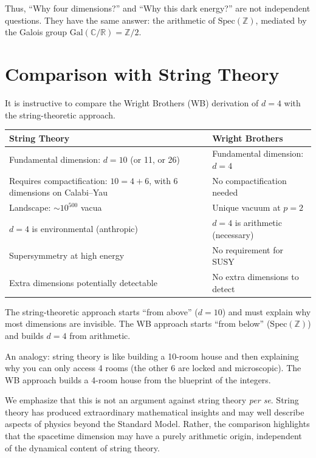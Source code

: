 \documentclass[12pt,a4paper]{article}
\theoremstyle{definition}
\newcommand{\Spec}{\mathrm{Spec}}
\newcommand{\Gal}{\mathrm{Gal}}
\newcommand{\ZZ}{\mathbb{Z}}
\newcommand{\RR}{\mathbb{R}}
\newcommand{\CC}{\mathbb{C}}
\begin{document}
Thus, ``Why four dimensions?'' and ``Why this dark energy?'' are not independent
questions. They have the same answer: the arithmetic of $\Spec(\ZZ)$, mediated by
the Galois group $\Gal(\CC/\RR) = \ZZ/2$.

\section{Comparison with String Theory}\label{sec:comparison}

It is instructive to compare the Wright Brothers (WB) derivation of $d=4$ with the
string-theoretic approach.

\begin{center}
\begin{tabular}{p{5.5cm}p{5.5cm}}
\toprule
\textbf{String Theory} & \textbf{Wright Brothers} \\
\midrule
Fundamental dimension: $d = 10$ (or 11, or 26) &
Fundamental dimension: $d = 4$ \\
\addlinespace
Requires compactification: $10 = 4 + 6$, with 6 dimensions on Calabi--Yau &
No compactification needed \\
\addlinespace
Landscape: $\sim 10^{500}$ vacua &
Unique vacuum at $p=2$ \\
\addlinespace
$d=4$ is environmental (anthropic) &
$d=4$ is arithmetic (necessary) \\
\addlinespace
Supersymmetry at high energy &
No requirement for SUSY \\
\addlinespace
Extra dimensions potentially detectable &
No extra dimensions to detect \\
\bottomrule
\end{tabular}
\end{center}

The string-theoretic approach starts ``from above'' ($d=10$) and must explain why
most dimensions are invisible. The WB approach starts ``from below''
($\Spec(\ZZ)$) and builds $d=4$ from arithmetic.

An analogy: string theory is like building a 10-room house and then explaining why
you can only access 4 rooms (the other 6 are locked and microscopic). The WB
approach builds a 4-room house from the blueprint of the integers.

We emphasize that this is not an argument against string theory \emph{per se}.
String theory has produced extraordinary mathematical insights and may well describe
aspects of physics beyond the Standard Model. Rather, the comparison highlights
that the spacetime dimension may have a purely arithmetic origin, independent of
the dynamical content of string theory.
\end{document}
